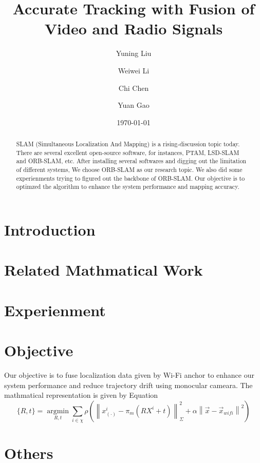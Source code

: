\documentclass[twocolumn]{article}
\title{Accurate Tracking with Fusion of Video and Radio Signals}
\author{Yuning Liu}
\author{Weiwei Li}
\author{Chi Chen}
\author{Yuan Gao}
\affil{University of New South Wales}
\date{\today}
\begin{document}
\maketitle
\begin{abstract}
     SLAM (Simultaneous Localization And Mapping) is a rising-discussion topic today. There are several excellent open-source software, for instances, PTAM, LSD-SLAM and ORB-SLAM, etc. After installing several softwares and digging out the limitation of different systems, We choose ORB-SLAM as our research topic. We also did some experienments trying to figured out the backbone of ORB-SLAM. Our objective is to optimzed the algorithm to enhance the system performance and mapping accuracy.
\end{abstract}

\section{Introduction}

\section{Related Mathmatical Work}

\section{Experienment}

\section{Objective}

Our objective is to fuse localization data given by Wi-Fi anchor to enhance our system performance and reduce trajectory drift using monocular cameara. The mathmatical representation is given by Equation \label{wifi math}
\begin{equation}
    \{R, t\} = \operatorname*{argmin}_{R, t} \sum_{i\in \chi} \rho(\left\|x^i_{(\cdot)}-\pi_{m}(RX^i+t)\right\|^2_\Sigma+\alpha\left\|\vec{x}-\vec{x}_{wifi}\right\|^2) \label{wifi math}
\end{equation}

\section{Others}
\end{document}
